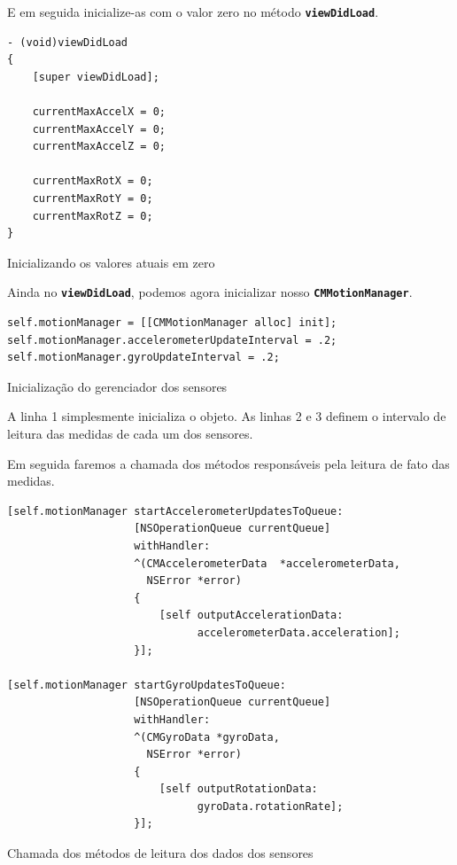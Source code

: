 \documentclass[a4paper,12pt,brazil,oneside]{book}
\begin{document}
E em seguida inicialize-as com o valor zero no método \texttt{\textbf{viewDidLoad}}.

\begin{listing}[H]
\begin{verbatim}
- (void)viewDidLoad
{
    [super viewDidLoad];
    
    currentMaxAccelX = 0;
    currentMaxAccelY = 0;
    currentMaxAccelZ = 0;
    
    currentMaxRotX = 0;
    currentMaxRotY = 0;
    currentMaxRotZ = 0;
}
\end{verbatim}
\caption{Inicializando os valores atuais em zero}
\end{listing}


Ainda no \texttt{\textbf{viewDidLoad}}, podemos agora inicializar nosso \texttt{\textbf{CMMotionManager}}.

\begin{listing}[H]
\begin{verbatim}
self.motionManager = [[CMMotionManager alloc] init];
self.motionManager.accelerometerUpdateInterval = .2;
self.motionManager.gyroUpdateInterval = .2;
\end{verbatim}
\caption{Inicialização do gerenciador dos sensores}
\end{listing}


A linha 1 simplesmente inicializa o objeto. As linhas 2 e 3 definem o intervalo de leitura das medidas de cada um dos sensores.

Em seguida faremos a chamada dos métodos responsáveis pela leitura de fato das medidas.

\begin{listing}[H]
\begin{verbatim}
[self.motionManager startAccelerometerUpdatesToQueue:
                    [NSOperationQueue currentQueue]
                    withHandler:
                    ^(CMAccelerometerData  *accelerometerData,
                      NSError *error)
                    {
                    	[self outputAccelerationData:
                    	      accelerometerData.acceleration];
                    }];
    
[self.motionManager startGyroUpdatesToQueue:
                    [NSOperationQueue currentQueue]
                    withHandler:
                    ^(CMGyroData *gyroData,
                      NSError *error)
                    {
                    	[self outputRotationData:
                    	      gyroData.rotationRate];
                    }];
\end{verbatim}
\caption{Chamada dos métodos de leitura dos dados dos sensores}
\end{listing}
\end{document}
